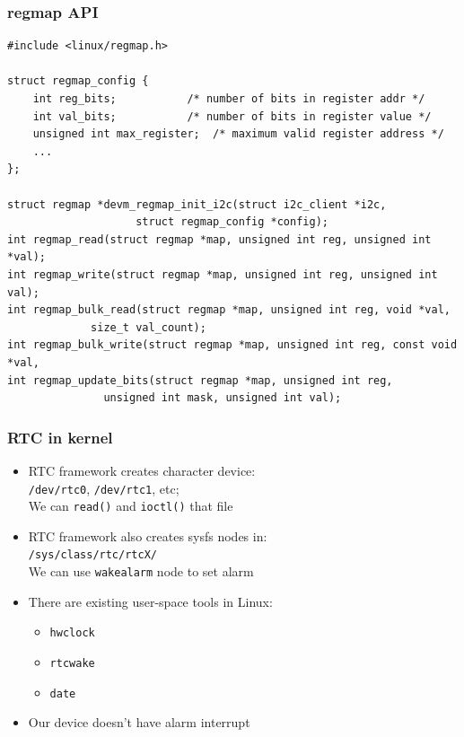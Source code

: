 \documentclass[aspectratio=169,usenames,dvipsnames]{beamer}
\newcounter{cont}
\begin{document}
\begin{frame}[containsverbatim]
  \frametitle{regmap API}
  \begin{lstlisting}
#include <linux/regmap.h>

struct regmap_config {
	int reg_bits;			/* number of bits in register addr */
	int val_bits;			/* number of bits in register value */
	unsigned int max_register;	/* maximum valid register address */
	...
};

struct regmap *devm_regmap_init_i2c(struct i2c_client *i2c,
				    struct regmap_config *config);
int regmap_read(struct regmap *map, unsigned int reg, unsigned int *val);
int regmap_write(struct regmap *map, unsigned int reg, unsigned int val);
int regmap_bulk_read(struct regmap *map, unsigned int reg, void *val,
		     size_t val_count);
int regmap_bulk_write(struct regmap *map, unsigned int reg, const void *val,
int regmap_update_bits(struct regmap *map, unsigned int reg,
		       unsigned int mask, unsigned int val);
  \end{lstlisting}
\end{frame}

\begin{frame}
  \frametitle{RTC in kernel}
  \begin{itemize}
    \item RTC framework creates character device: \\
          \texttt{/dev/rtc0}, \texttt{/dev/rtc1}, etc; \\
          We can \texttt{read()} and \texttt{ioctl()} that file
    \item RTC framework also creates sysfs nodes in: \\
          \texttt{/sys/class/rtc/rtcX/} \\
          We can use \texttt{wakealarm} node to set alarm
    \item There are existing user-space tools in Linux:
      \begin{itemize}
        \item \texttt{hwclock}
        \item \texttt{rtcwake}
        \item \texttt{date}
      \end{itemize}
    \item Our device doesn't have alarm interrupt
  \end{itemize}
\end{frame}
\end{document}
